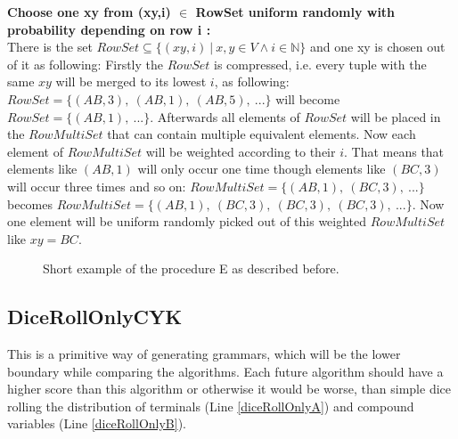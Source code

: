 \noindent \textbf{Choose one xy from (xy,i) $\in$ RowSet uniform randomly with probability depending on row i  :}\\
There is the set $RowSet \subseteq \{(xy,i)\ |\ x,y \in V \wedge i \in \mathbb{N} \}$ and one xy is chosen out of it as following:
Firstly the $RowSet$ is compressed, i.e. every tuple with the same $xy$ will be merged to its lowest $i$, as following: $RowSet = \{(AB,3),~(AB,1),~(AB,5),~... \}$ will become $RowSet = \{(AB,1),~... \}$. Afterwards all elements of $RowSet$ will be placed in the $RowMultiSet$ that  can contain multiple equivalent elements. Now each element of $RowMultiSet$ will be weighted according to their $i$. That means that elements like $(AB,1)$ will only occur one time though elements like $(BC,3)$ will occur three times and so on: $RowMultiSet = \{(AB,1),~(BC,3),~...\}$ becomes $RowMultiSet = \{(AB,1),~(BC,3),~(BC,3),~(BC,3),~...\}$. Now one element will be uniform randomly picked out of this weighted $RowMultiSet$ like $xy = BC$.\\

\noindent
\begin{figure} [h]
	\begin{minipage}{6in}
		\centering
	\end{minipage}
	\caption{Short example of the procedure E as described before.}
\end{figure}

\subsection{DiceRollOnlyCYK} \label{diceRollOnlyCYK}
\noindent This is a primitive way of generating grammars, which will be the lower boundary while comparing the algorithms. Each future algorithm should have a higher score than this algorithm or otherwise it would be worse, than simple dice rolling the distribution of terminals (Line \ref{diceRollOnlyA}) and compound variables (Line \ref{diceRollOnlyB}). \\

